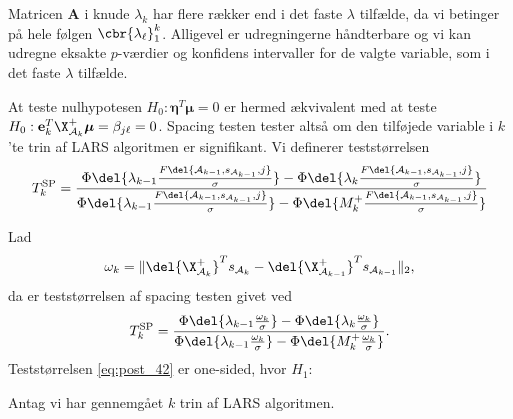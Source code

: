 Matricen \(\mathbf{A}\) i knude \(\lambda_k\) har flere rækker end i det faste \(\lambda\) tilfælde, da vi betinger på hele følgen \(\cbr{\lambda_\ell}_1^k\).
Alligevel er udregningerne håndterbare og vi kan udregne eksakte \(p\)-værdier og konfidens intervaller for de valgte variable, som i det faste \(\lambda\) tilfælde.



At teste nulhypotesen \(H_0: \boldsymbol{\eta}^T \boldsymbol{\mu} =0\) er hermed ækvivalent med at teste \(H_0: \mathbf{e}_k^T \X_{\mathcal{A}_k}^+ \boldsymbol{\mu}=\beta_{j \ell}=0\).
Spacing testen tester altså om den tilføjede variable i \(k\)'te trin af LARS algoritmen er signifikant.
Vi definerer teststørrelsen
\begin{align*}
T_k^{\text{SP}}= \frac{\Phi \del{\lambda_{k-1} \frac{F \del{\mathcal{A}_{k-1}, s_{\mathcal{A}_{k-1}}, j}}{\sigma}} - \Phi \del{\lambda_{k} \frac{F \del{\mathcal{A}_{k-1}, s_{\mathcal{A}_{k-1}}, j}}{\sigma}}}{\Phi \del{\lambda_{k-1} \frac{F \del{\mathcal{A}_{k-1}, s_{\mathcal{A}_{k-1}}, j}}{\sigma}} - \Phi \del{M_{k}^+ \frac{F \del{\mathcal{A}_{k-1}, s_{\mathcal{A}_{k-1}}, j}}{\sigma}}}
\end{align*}


Lad
\begin{align*}
\omega_k = \Vert \del{\X_{\mathcal{A}_k}^+}^T s_{\mathcal{A}_k} -   \del{\X_{\mathcal{A}_{k-1}}^+}^T s_{\mathcal{A}_{k-1}} \Vert_2,
\end{align*}
da er teststørrelsen af spacing testen givet ved
\begin{align}
T_k^{\text{SP}}= \frac{\Phi \del{\lambda_{k-1} \frac{\omega_k}{\sigma}} - \Phi \del{\lambda_{k} \frac{\omega_k}{\sigma}}}{\Phi \del{\lambda_{k-1} \frac{\omega_k}{\sigma}} - \Phi \del{M_{k}^+ \frac{\omega_k}{\sigma}}} \label{eq:post_42}.
\end{align}
Teststørrelsen \eqref{eq:post_42} er one-sided, hvor \(H_1: \)



\begin{thm}
Antag vi har gennemgået \(k\) trin af LARS algoritmen.

\end{thm}
